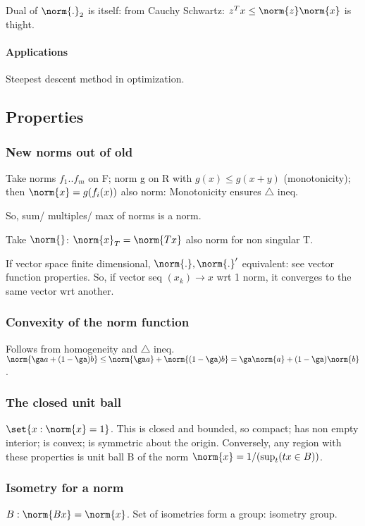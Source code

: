 \documentclass[oneside, article]{memoir}
\begin{document}
Dual of $\norm{.}_2$ is itself: from Cauchy Schwartz: $z^{T}x \leq \norm{z}\norm{x}$ is thight.

\paragraph*{Applications}
Steepest descent method in optimization.

\subsection{Properties}
\subsubsection{New norms out of old}
Take norms $f_{1} .. f_{m}$ on F; norm g on R with $g(x) \leq g(x+y)$ (monotonicity); then $\norm{x} = g(f_{i}(x))$ also norm: Monotonicity ensures $\triangle$ ineq.

So, sum/ multiples/ max of norms is a norm.

Take $\norm{}$: $\norm{x}_{T} = \norm{Tx}$ also norm for non singular T.

If vector space finite dimensional, $\norm{.}, \norm{.}'$ equivalent: see vector function properties. So, if vector seq $(x_{k}) \to x$ wrt 1 norm, it converges to the same vector wrt another.

\subsubsection{Convexity of the norm function}
Follows from homogeneity and $\triangle$ ineq. $\norm{\ga a+ (1- \ga)b} \leq \norm{\ga a} + \norm{(1- \ga)b} = \ga\norm{a} + (1- \ga)\norm{b}$.

\subsubsection{The closed unit ball}
$\set{x: \norm{x} = 1}$. This is closed and bounded, so compact; has non empty interior; is convex; is symmetric about the origin. Conversely, any region with these properties is unit ball B of the norm $\norm{x} = 1/(\sup_t (tx \in B))$.



\subsubsection{Isometry for a norm}
$B: \norm{Bx} = \norm{x}$. Set of isometries form a group: isometry group. \why
\end{document}
